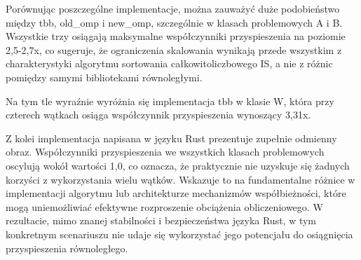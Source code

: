 Porównując poszczególne implementacje, można zauważyć duże podobieństwo między tbb, old\_omp i new\_omp, szczególnie w klasach problemowych A i B. Wszystkie trzy osiągają maksymalne współczynniki przyspieszenia na poziomie 2,5-2,7x, co sugeruje, że ograniczenia skalowania wynikają przede wszystkim z charakterystyki algorytmu sortowania całkowitoliczbowego IS, a nie z różnic pomiędzy samymi bibliotekami równoległymi.

Na tym tle wyraźnie wyróżnia się implementacja tbb w klasie W, która przy czterech wątkach osiąga współczynnik przyspieszenia wynoszący 3,31x.

Z kolei implementacja napisana w języku Rust prezentuje zupełnie odmienny obraz. Współczynniki przyspieszenia we wszystkich klasach problemowych oscylują wokół wartości 1,0, co oznacza, że praktycznie nie uzyskuje się żadnych korzyści z wykorzystania wielu wątków. Wskazuje to na fundamentalne różnice w implementacji algorytmu lub architekturze mechanizmów współbieżności, które mogą uniemożliwiać efektywne rozproszenie obciążenia obliczeniowego. W rezultacie, mimo znanej stabilności i bezpieczeństwa języka Rust, w tym konkretnym scenariuszu nie udaje się wykorzystać jego potencjału do osiągnięcia przyspieszenia równoległego.

